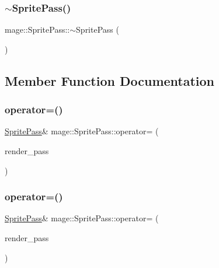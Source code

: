 \hypertarget{classmage_1_1_sprite_pass_a70a866324750c21196d80364e9a0e309}{}\label{classmage_1_1_sprite_pass_a70a866324750c21196d80364e9a0e309} 
\subsubsection{\texorpdfstring{$\sim$\+Sprite\+Pass()}{~SpritePass()}}
{\footnotesize\ttfamily mage\+::\+Sprite\+Pass\+::$\sim$\+Sprite\+Pass (\begin{DoxyParamCaption}{ }\end{DoxyParamCaption})\hspace{0.3cm}{\ttfamily [default]}}



\subsection{Member Function Documentation}
\hypertarget{classmage_1_1_sprite_pass_afa43bb0a8588e9196180aa686d81cacc}{}\label{classmage_1_1_sprite_pass_afa43bb0a8588e9196180aa686d81cacc} 
\subsubsection{\texorpdfstring{operator=()}{operator=()}\hspace{0.1cm}{\footnotesize\ttfamily [1/2]}}
{\footnotesize\ttfamily \hyperlink{classmage_1_1_sprite_pass}{Sprite\+Pass}\& mage\+::\+Sprite\+Pass\+::operator= (\begin{DoxyParamCaption}\item[{const \hyperlink{classmage_1_1_sprite_pass}{Sprite\+Pass} \&}]{render\+\_\+pass }\end{DoxyParamCaption})\hspace{0.3cm}{\ttfamily [delete]}}

\hypertarget{classmage_1_1_sprite_pass_aed8cc2bcb9ded1cb96c9d65bb7034c0a}{}\label{classmage_1_1_sprite_pass_aed8cc2bcb9ded1cb96c9d65bb7034c0a} 
\subsubsection{\texorpdfstring{operator=()}{operator=()}\hspace{0.1cm}{\footnotesize\ttfamily [2/2]}}
{\footnotesize\ttfamily \hyperlink{classmage_1_1_sprite_pass}{Sprite\+Pass}\& mage\+::\+Sprite\+Pass\+::operator= (\begin{DoxyParamCaption}\item[{\hyperlink{classmage_1_1_sprite_pass}{Sprite\+Pass} \&\&}]{render\+\_\+pass }\end{DoxyParamCaption})\hspace{0.3cm}{\ttfamily [delete]}}

